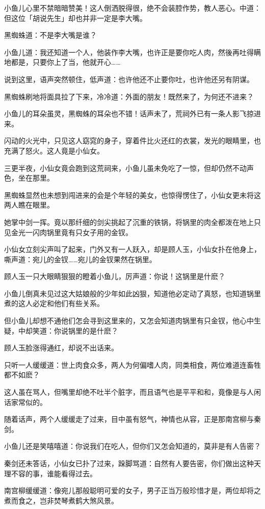 \documentclass[12pt,oneside]{book}
\begin{document}
小鱼儿心里不禁暗暗赞美！这人倒洒脱得很，绝不会装腔作势，教人恶心。中道：但这位「胡说先生」却也并非一定是李大嘴。

黑蜘蛛道：不是李大嘴是谁？

小鱼儿道：我还知道一个人，他装作李大嘴，也许正是要你吃人肉，然後再吐得瞒地都是，只要你上了当，他就开心\ldots\ldots{}

说到这里，语声突然顿住，低声道：也许他还不止要你吐，也许他还另有阴谋。

黑蜘蛛刷地将面具拉了下来，冷冷道：外面的朋友！既然来了，为何还不进来？

小鱼儿的耳朵虽灵，黑蜘蛛的耳朵也不错！话声未了，荒祠外已有一条人影飞掠进来。

闪动的火光中，只见这人窈窕的身子，穿着件比火还红的衣裳，发光的眼睛里，也充满了怒火。这人竟是小仙女。

三更半夜，小仙女竟会跑到这荒祠来，小鱼儿虽未免吃了一惊，但却仍然不动声色，坐在那里。

黑蜘蛛显然也未想到闯进来的会是个年轻的美女，也惊得愣住了，小仙女更未将这两人瞧在眼里。

她掌中剑一挥。竟以那纤细的剑尖挑起了沉重的铁锅，将锅里的肉全都泼在地上只见金光一闪肉锅里竟有只女子用的金钗。

小仙女立刻尖声叫了起来，门外又有一人跃入，却是顾人玉，小仙女扑在他身上，嘶声道：宛儿的金钗\ldots\ldots 宛儿的金钗果然在锅里。

顾人玉一只大眼睛狠狠的瞪着小鱼儿，厉声道：你说！这锅里是什麽？

小鱼儿倒真未见过这大姑娘般的少年如此凶狠，知道他必定动了真怒，也知道锅里煮的这人必定和他们有些关系。

但小鱼儿却想不通他们怎会寻到这里来的，又怎会知道肉锅里有只金钗，他心中生疑，中却笑道：你说锅里的是什麽？

顾人玉脸涨得通红，却说不出话来。

只听一人缓缓道：世上肉食众多，两人为何偏嗜人肉，同类相食，两位难道连畜牲都不如麽？

这人虽在骂人，但嘴里却绝不吐半个脏字，而且语气也是平平和和，竟像是与人闲话家常似的。

随着话声，两个人缓缓走了过来，目中虽有怒气，神情也从容，正是那南宫柳与秦剑。

小鱼儿还是笑嘻嘻道：你说我们在吃人，但你们又怎会知道的，莫非是有人告密？

秦剑还未答话，小仙女已扑了过来，跺脚骂道：自然有人要告密，你们做出这种天理不容的事，谁能看得过去。

南宫柳缓缓道：像宛儿那般聪明可爱的女子，男子正当万般珍惜才是，两位却将之煮而食之，岂非焚琴煮鹤大煞风景。
\end{document}
